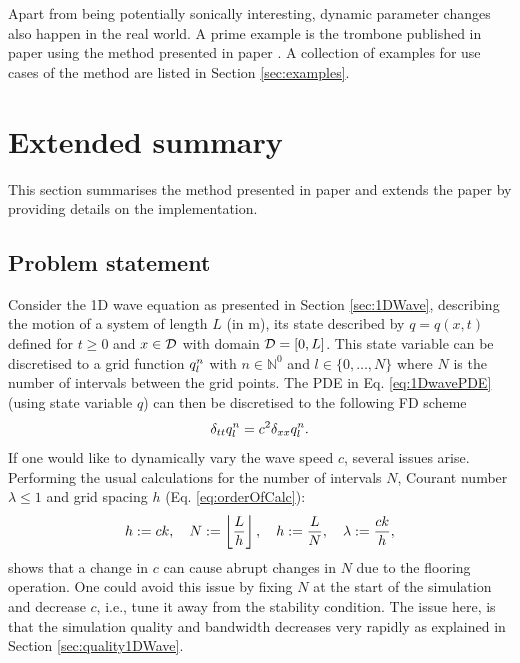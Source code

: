 Apart from being potentially sonically interesting, dynamic parameter changes also happen in the real world. A prime example is the trombone published in paper \citeP[H] using the method presented in paper \citeP[G]. A collection of examples for use cases of the method are listed in Section \ref{sec:examples}.

\section{Extended summary}
This section summarises the method presented in paper \citeP[G] and extends the paper by providing details on the implementation. 

\subsection{Problem statement}
Consider the 1D wave equation  as presented in Section \ref{sec:1DWave}, describing the motion of a system of length $L$ (in m), its state described by $q = q(x,t)$ defined for $t\geq 0$ and $x\in\mathcal{D}$ with domain $\mathcal{D} = [0, L]$. This state variable can be discretised to a grid function $q_l^n$ with $n\in \mathbb{N}^0$ and $l \in \{0, \hdots, N\}$ where $N$ is the number of intervals between the grid points. The PDE in Eq. \eqref{eq:1DwavePDE} (using state variable $q$) can then be discretised to the following FD scheme
\begin{equation}\label{eq:1DWaveDynamic}
    \delta_{tt} q_l^n = c^2\delta_{xx} q_l^n.
\end{equation}
If one would like to dynamically vary the wave speed $c$, several issues arise. Performing the usual calculations for the number of intervals $N$, Courant number $\lambda\leq 1$ and grid spacing $h$ (Eq. \eqref{eq:orderOfCalc}):
\begin{equation}\label{eq:dynamicOrderOfCalc}
    h := ck, \quad N := \floor[\frac{L}{h}], \quad h := \frac{L}{N}, \quad \lambda := \frac{ck}{h},
\end{equation}
shows that a change in $c$ can cause abrupt changes in $N$ due to the flooring operation. One could avoid this issue by fixing $N$ at the start of the simulation and decrease $c$, i.e., tune it away from the stability condition. The issue here, is that the simulation quality and bandwidth decreases very rapidly as explained in Section \ref{sec:quality1DWave}. 

